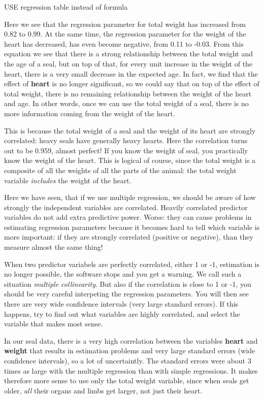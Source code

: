 \documentclass[]{book}\usepackage[]{graphicx}\usepackage[]{color}
\begin{document}
USE regression table instead of formula


Here we see that the regression parameter for total weight has increased from 0.82 to 0.99. At the same time, the regression parameter for the weight of the heart has decreased, has even become negative, from 0.11 to -0.03. From this equation we see that there is a strong relationship between the total weight and the age of a seal, but on top of that, for every unit increase in the weight of the heart, there is a very small decrease in the expected age. In fact, we find that the effect of \textbf{heart} is no longer significant, so we could say that on top of the effect of total weight, there is no remaining relationship between the weight of the heart and age. In other words, once we can use the total weight of a seal, there is no more information coming from the weight of the heart.

This is because the total weight of a seal and the weight of its heart are strongly correlated: heavy seals have generally heavy hearts. Here the correlation turns out to be 0.959, almost perfect! If you know the weight of seal, you practically know the weight of the heart. This is logical of course, since the total weight is a composite of all the weights of all the parts of the animal: the total weight variable \textit{includes} the weight of the heart.

Here we have seen, that if we use multiple regression, we should be aware of how strongly the independent variables are correlated. Heavily correlated predictor variables do not add extra predictive power. Worse: they can cause problems in estimating regression parameters because it becomes hard to tell which variable is more important: if they are strongly correlated (positive or negative), than they measure almost the same thing!

When two predictor variabels are perfectly correlated, either 1 or -1, estimation is no longer possible, the software stops and you get a warning. We call such a situation \textit{multiple collinearity}. But also if the correlation is close to 1 or -1, you should be very careful interpeting the regression parameters. You will then see there are very wide confidence intervals (very large standard errors). If this happens, try to find out what variables are highly correlated, and select the variable that makes most sense.

In our seal data, there is a very high correlation between the variables \textbf{heart} and \textbf{weight} that results in estimation problems and very large standard errors (wide confidence intervals), so a lot of uncertaintly. The standard errors were about 3 times as large with the multiple regression than with simple regressions. It makes therefore more sense to use only the total weight variable, since when seals get older, \textit{all} their organs and limbs get larger, not just their heart.
\end{document}
